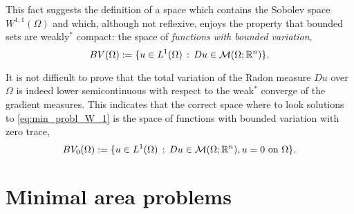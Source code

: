 This fact suggests the definition of a space which contains the Sobolev space $W^{1, 1}(\Omega)$ and which, although not reflexive, enjoys the property that bounded sets are weakly$^*$ compact: the space of {\em functions with bounded variation},
\begin{equation*}
BV(\Omega) := \{ u \in L^{1}(\Omega) \, : \, Du \in \mathcal{M}(\Omega; \mathbb{R}^{n}) \}.
\end{equation*}

It is not difficult to prove that the total variation of the Radon measure $Du$ over $\Omega$ is indeed lower semicontinuous with respect to the weak$^*$ converge of the gradient measures. This indicates that the correct space where to look solutions to \eqref{eq:min_probl_W_1} is the space of functions with bounded variation with zero trace, 
\begin{equation*}
BV_{0}(\Omega) := \{ u \in L^{1}(\Omega) \, : \, Du \in \mathcal{M}(\Omega; \mathbb{R}^{n}), u = 0 \ \text{on} \ \Omega \}.
\end{equation*}

\section*{Minimal area problems}

